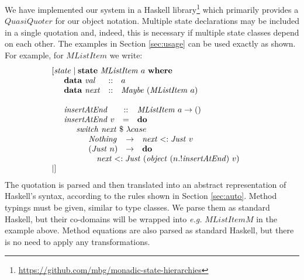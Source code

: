 We have implemented our system in a Haskell library\footnote{\url{https://github.com/mbg/monadic-state-hierarchies}} which primarily provides a $\mathit{QuasiQuoter}$ \citep{mainland2007s} for our object notation. Multiple state declarations may be included in a single quotation and, indeed, this is necessary if multiple state classes depend on each other. The examples in Section \ref{sec:usage} can be used exactly as shown. For example, for $\mathit{MListItem}$ we write:
\begin{displaymath}
\begin{array}{l}
[\mathit{state}\mid \mathbf{state}~\mathit{MListItem}~a~\mathbf{where} \\
\quad \begin{array}{lcl}
\mathbf{data}~\mathit{val} & :: & a \\
\mathbf{data}~\mathit{next}  & :: & \mathit{Maybe}~(\mathit{MListItem}~a)
\end{array}\\\\
\quad \begin{array}{lcl}
\mathit{insertAtEnd} & :: & \mathit{MListItem}~a \to ()\\
\mathit{insertAtEnd}~v & = & \mathbf{do} \\
\multicolumn{3}{l}{\quad \begin{array}{l}
    \mathit{switch}~\mathit{next}~\$~\lambda case \\
    \quad \begin{array}{lcl}
    \mathit{Nothing} & \to & \mathit{next} <: \mathit{Just}~v  \\
    (\mathit{Just}~n) & \to & \mathbf{do} \\
    \multicolumn{3}{l}{\quad \mathit{next} <: \mathit{Just}~(\mathit{object}~(n.!\mathit{insertAtEnd})~v) }
    \end{array}
    \end{array}}
\end{array}\\\mid]
\end{array}
\end{displaymath}
The quotation is parsed and then translated into an abstract representation of Haskell's syntax, according to the rules shown in Section \ref{sec:auto}. Method typings must be given, similar to type classes. We parse them as standard Haskell, but their co-domains will be wrapped into \emph{e.g.} $\mathit{MListItemM}$ in the example above. Method equations are also parsed as standard Haskell, but there is no need to apply any transformations. 

